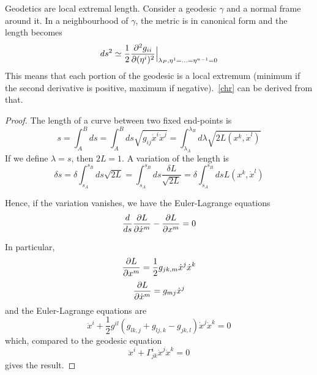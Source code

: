     Geodetics are local extremal length. Consider a geodesic $\gamma$ and a normal frame around it. In a neighbourhood of $\gamma$, the metric is in canonical form and the length becomes 
    \begin{equation*}
        ds^2 \simeq \frac{1}{2} \frac{\partial^2 g_{ii}}{\partial(\eta^i)^2} \Big \vert_{\lambda_P, \eta^1=\ldots=\eta^{n-1}=0}
    \end{equation*}
    This means that each portion of the geodesic is a local extremum (minimum if the second derivative is positive, maximum if negative).~\eqref{chr} can be derived from that.

    \begin{proof}
        The length of a curve between two fixed end-points is 
        \begin{equation*}
            s = \int_{A}^{B} ds = \int_{A}^{B} ds \sqrt{g_{ij} \dot x^i \dot x^j} = \int_{\lambda_A}^{\lambda_B} d\lambda \sqrt{2 L(x^k, \dot x^l)}
        \end{equation*}
        If we define $\lambda = s$, then $2L = 1$. A variation of the length is 
        \begin{equation*}
            \delta s = \delta \int_{s_A}^{s_B} ds \sqrt{2L} = \int_{s_A}^{s_B} ds \frac{\delta L}{\sqrt{2L}} = \delta \int_{s_A}^{s_B} ds L(x^k, \dot x^l)
        \end{equation*}

        Hence, if the variation vanishes, we have the Euler-Lagrange equations 
        \begin{equation*}
            \frac{d}{ds} \frac{\partial L}{\partial\dot x^m} - \frac{\partial L}{\partial x^m} = 0
        \end{equation*}

        In particular, 
        \begin{equation*}
            \frac{\partial L}{\partial x^m} = \frac{1}{2} g_{jk,m} \dot x^j \dot x^k
        \end{equation*}
        \begin{equation*}
            \frac{\partial L}{\partial\dot x^m} = g_{mj} \dot x^j
        \end{equation*}
        and the Euler-Lagrange equations are 
        \begin{equation*}
            \ddot x^i + \frac{1}{2} g^{il} (g_{lk,j} + g_{lj,k} - g_{jk,l}) \dot x^j \dot x^k = 0
        \end{equation*}
        which, compared to the geodesic equation 
        \begin{equation*}
            \ddot x^i + \Gamma^i_{jk} \dot x^j \dot x^k = 0
        \end{equation*}
        gives the result.
    \end{proof}

